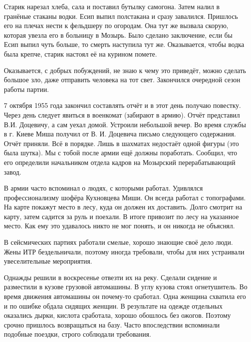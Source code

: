 Старик нарезал хлеба, сала и поставил бутылку самогона. Затем налил в гранёные стаканы водки. Есип выпил полстакана и сразу завалился. Пришлось его на плечах нести к фельдшеру по огородам. Она тут же вызвала скорую, которая увезла его в больницу в Мозырь. Было сделано заключение, если бы Есип выпил чуть больше, то смерть наступила тут же. Оказывается, чтобы водка была крепче, старик настоял её на курином помете.

Оказывается, с добрых побуждений, не знаю к чему это приведёт, можно сделать большое зло, даже отправить человека на тот свет. Закончился очередной сезон работы партии.

7 октября 1955 года закончил составлять отчёт и в этот день получаю повестку. Через день следует явиться в военкомат (забирают в армию). Отчёт представил В.И. Доцевичу, а сам уехал домой. Устроили небольшой вечер. Во время службы в г. Киеве Миша получил от В. И. Доцевича письмо следующего содержания. Отчёт приняли. Всё в порядке. Лишь в шахматах недостаёт одной фигуры (это была шутка). Мы с тобой после армии ещё должны поработать. Сообщил, что его определили начальником отдела кадров на Мозырский перерабатывающий завод.

В армии часто вспоминал о людях, с которыми работал. Удивлялся профессионализму шофёра Кухновцева Миши. Он всегда работал с топографами. На карте покажут место в лесу, куда он должен их доставить. Долго смотрит на карту, затем садится за руль и поехали. В итоге привозит по лесу на указанное место. Как ему это удавалось никто не мог понять, и он никогда не объяснял.

В сейсмических партиях работали смелые, хорошо знающие своё дело люди. Жены ИТР бездельничали, поэтому иногда требовали, чтобы для них устраивали увеселительные мероприятия.

Однажды решили в воскресенье отвезти их на реку. Сделали сидение и разместили в кузове грузовой автомашины. В углу кузова стоял огнетушитель. Во время движения автомашины он почему-то сработал. Одна женщина схватила его и по ошибке обдала сидящих женщин. В результате на одежде отдельных оказались дырки, кислота сработала, хорошо обошлось без ожогов. Поэтому срочно пришлось возвращаться на базу. Часто впоследствии вспоминали подобные поездки, строго соблюдали требования.